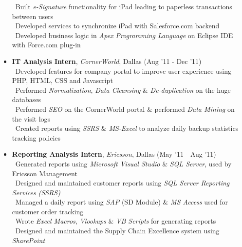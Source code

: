\documentclass[11pt]{article}
\begin{document}
\begin{itemize}
		\textendash\ Built \textit{e-Signature} functionality for iPad leading to paperless transactions between users\\
		\textendash\ Developed services to synchronize iPad with Salesforce.com backend\\
		\textendash\ Developed business logic in \textit{Apex Programming Language} on Eclipse IDE with Force.com plug-in\\
	\item{\textbf{IT Analysis Intern}, \textit{CornerWorld}, Dallas \hfill (Aug '11 - Dec '11)}\\
		\textendash\ Developed features for company portal to improve user experience using PHP, HTML, CSS and Javascript\\
		\textendash\ Performed \textit{Normalization}, \textit{Data Cleansing} \& \textit{De-duplication} on the huge databases\\
 		\textendash\ Performed \textit{SEO} on the CornerWorld portal \& performed \textit{Data Mining} on the visit logs\\
		\textendash\ Created reports using \textit{SSRS} \& \textit{MS-Excel} to analyze daily backup statistics tracking policies\\
	\item{\textbf{Reporting Analysis Intern}, \textit{Ericsson}, Dallas \hfill (May '11 - Aug 
	'11)}\\
		\textendash\ Generated reports using \textit{Microsoft Visual Studio} \& \textit{SQL Server}, used by Ericsson Management\\
		\textendash\ Designed and maintained customer reports using \textit{SQL Server Reporting Services (SSRS)}\\
		\textendash\ Managed a daily report using \textit{SAP} (SD Module) \& \textit{MS Access} used for customer order tracking\\
		\textendash\ Wrote \textit{Excel Macros}, \textit{Vlookups} \& \textit{VB Scripts} for generating reports\\
		\textendash\ Designed and maintained the Supply Chain Excellence system using \textit{SharePoint}\\

\end{itemize}
\end{document}
